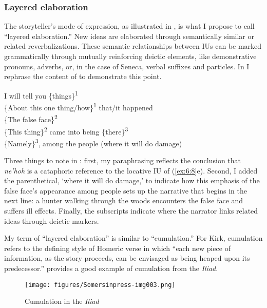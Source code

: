\subsubsection{Layered elaboration}\label{sec:6.1.3.2}

The storyteller’s mode of expression, as illustrated in , is what I propose to call “layered elaboration.” New ideas are elaborated through semantically similar or related reverbalizations. These semantic relationships between IUs can be marked grammatically through mutually reinforcing deictic elements, like demonstrative pronouns, adverbs, or, in the case of Seneca, verbal suffixes and particles. In  I rephrase the content of  to demonstrate this point.

\ea%
    \label{ex:6:9}
I will tell you \{things\}\textsuperscript{1}                                         \\
\{About this one thing/how\}\textsuperscript{1} that/it happened                      \\
\{The false face\}\textsuperscript{2}                                                 \\
\{This thing\}\textsuperscript{2} came into being \{there\}\textsuperscript{3}        \\
\{Namely\}\textsuperscript{3}, among the people (where it will do damage)             \\
    \z

\noindent Three things to note in : first, my paraphrasing reflects the conclusion that \textit{ne’hoh} is a cataphoric reference to the locative IU of (\ref{ex:6:8}e). Second, I added the parenthetical, ‘where it will do damage,’ to indicate how this emphasis of the false face’s appearance among people sets up the narrative that begins in the next line: a hunter walking through the woods encounters the false face and suffers ill effects. Finally, the subscripts indicate where the narrator links related ideas through deictic markers.

My term of “layered elaboration” is similar to  “cumulation.” For Kirk, cumulation refers to the defining style of Homeric verse in which “each new piece of information, as the story proceeds, can be envisaged as being heaped upon its predecessor.” \citet[50]{Bakker1997} provides a good example of cumulation from the \textit{Iliad}.

\begin{figure}
\caption{Cumulation in the \textit{Iliad}}    \label{exfig:6:10}

\texttt{[image: figures/Somersinpress-img003.png]}
\end{figure}


